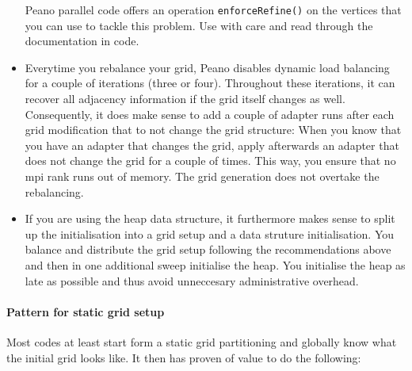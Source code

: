 \begin{itemize}
  \begin{remark}
    Peano parallel code offers an operation \texttt{enforceRefine()} on
    the vertices that you can use to tackle this problem. Use with care and 
    read through the documentation in code.
  \end{remark}
  \item Everytime you rebalance your grid, Peano disables dynamic load balancing
  for a couple of iterations (three or four). Throughout these iterations, it
  can recover all adjacency information if the grid itself changes as well.
  Consequently, it does make sense to add a couple of adapter runs after each
  grid modification that to not change the grid structure: When you know that
  you have an adapter that changes the grid, apply afterwards an adapter that
  does not change the grid for a couple of times. This way, you ensure that no
  mpi rank runs out of memory. The grid generation does not overtake the rebalancing.
  \item If you are using the heap data structure, it furthermore makes sense to split up
the initialisation into a grid setup and a data struture initialisation.
You balance and distribute the grid setup following the recommendations above
and then in one additional sweep initialise the heap.
You initialise the heap as late as possible and thus avoid unneccesary
administrative overhead.
\end{itemize}


\paragraph{Pattern for static grid setup}

Most codes at least start form a static grid partitioning and globally know
what the initial grid looks like.
It then has proven of value to do the following:

